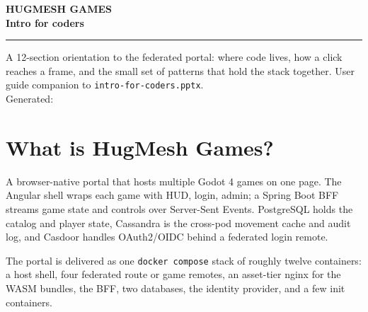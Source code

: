 \documentclass[11pt,a4paper,openany]{book}
\begin{document}
\begin{titlepage}
\thispagestyle{empty}
\noindent{}
\vspace*{4cm}\noindent
{\sffamily\bfseries
  {\color{snapAccentTwo}\fontsize{18}{22}\selectfont HUGMESH GAMES}\\[3mm]
  {\color{white}\fontsize{42}{50}\selectfont Intro for coders}\par}
\vspace{1.5cm}
\noindent\color{white!75!snapAccentTwo}\rule{0.4\linewidth}{1.2pt}
\vspace{0.8cm}
\noindent
{\sffamily\color{white!85}\large
A 12-section orientation to the federated portal: where code lives,
how a click reaches a frame, and the small set of patterns that hold
the stack together.}
\vfill\noindent
{\sffamily\color{white!70}\small
User guide companion to \texttt{intro-for-coders.pptx}.\\
Generated: \snapbuilddate{} \snapbuildtime}
\end{titlepage}

\frontmatter
\pagestyle{empty}
\tableofcontents
\clearpage
\mainmatter
\pagestyle{fancy}

\chapter{What is HugMesh Games?}
A browser-native portal that hosts multiple Godot 4 games on one page.
The Angular shell wraps each game with HUD, login, admin; a Spring Boot
BFF streams game state and controls over Server-Sent Events. PostgreSQL
holds the catalog and player state, Cassandra is the cross-pod movement
cache and audit log, and Casdoor handles OAuth2/OIDC behind a federated
login remote.

The portal is delivered as one \texttt{docker compose} stack of
roughly twelve containers: a host shell, four federated route or game
remotes, an asset-tier nginx for the WASM bundles, the BFF, two
databases, the identity provider, and a few init containers.
\end{document}
